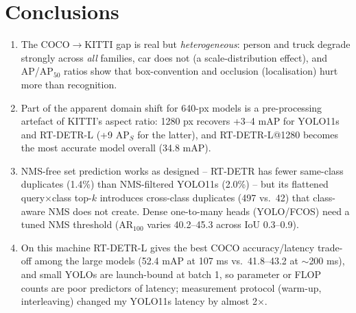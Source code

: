 \documentclass[10pt]{article}
\begin{document}
\section{Conclusions}
\begin{enumerate}
\item The COCO$\rightarrow$KITTI gap is real but \emph{heterogeneous}: person and truck degrade strongly across \emph{all} families, car does not (a scale-distribution effect), and AP/AP$_{50}$ ratios show that box-convention and occlusion (localisation) hurt more than recognition.
\item Part of the apparent domain shift for 640-px models is a pre-processing artefact of KITTI's aspect ratio: 1280 px recovers +3--4 mAP for YOLO11s and RT-DETR-L (+9 AP$_S$ for the latter), and RT-DETR-L@1280 becomes the most accurate model overall (34.8 mAP).
\item NMS-free set prediction works as designed -- RT-DETR has fewer same-class duplicates (1.4\%) than NMS-filtered YOLO11s (2.0\%) -- but its flattened query$\times$class top-$k$ introduces cross-class duplicates (497 vs.\ 42) that class-aware NMS does not create. Dense one-to-many heads (YOLO/FCOS) need a tuned NMS threshold (AR$_{100}$ varies 40.2--45.3 across IoU 0.3--0.9).
\item On this machine RT-DETR-L gives the best COCO accuracy/latency trade-off among the large models (52.4 mAP at 107 ms vs.\ 41.8--43.2 at $\sim$200 ms), and small YOLOs are launch-bound at batch 1, so parameter or FLOP counts are poor predictors of latency; measurement protocol (warm-up, interleaving) changed my YOLO11s latency by almost 2$\times$.
\end{enumerate}
\end{document}
